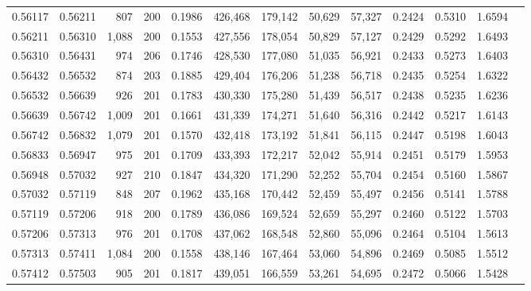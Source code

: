 \begin{tabular}{rrrrrrrrrrrrr}
0.56117 & 0.56211 &   807 & 200 &                                     0.1986 & 426,468 & 179,142 &  50,629 &  57,327 & 0.2424 & 0.5310 & 1.6594 \\
0.56211 & 0.56310 & 1,088 & 200 &                                     0.1553 & 427,556 & 178,054 &  50,829 &  57,127 & 0.2429 & 0.5292 & 1.6493 \\
0.56310 & 0.56431 &   974 & 206 &                                     0.1746 & 428,530 & 177,080 &  51,035 &  56,921 & 0.2433 & 0.5273 & 1.6403 \\
0.56432 & 0.56532 &   874 & 203 &                                     0.1885 & 429,404 & 176,206 &  51,238 &  56,718 & 0.2435 & 0.5254 & 1.6322 \\
0.56532 & 0.56639 &   926 & 201 &                                     0.1783 & 430,330 & 175,280 &  51,439 &  56,517 & 0.2438 & 0.5235 & 1.6236 \\
0.56639 & 0.56742 & 1,009 & 201 &                                     0.1661 & 431,339 & 174,271 &  51,640 &  56,316 & 0.2442 & 0.5217 & 1.6143 \\
0.56742 & 0.56832 & 1,079 & 201 &                                     0.1570 & 432,418 & 173,192 &  51,841 &  56,115 & 0.2447 & 0.5198 & 1.6043 \\
0.56833 & 0.56947 &   975 & 201 &                                     0.1709 & 433,393 & 172,217 &  52,042 &  55,914 & 0.2451 & 0.5179 & 1.5953 \\
0.56948 & 0.57032 &   927 & 210 &                                     0.1847 & 434,320 & 171,290 &  52,252 &  55,704 & 0.2454 & 0.5160 & 1.5867 \\
0.57032 & 0.57119 &   848 & 207 &                                     0.1962 & 435,168 & 170,442 &  52,459 &  55,497 & 0.2456 & 0.5141 & 1.5788 \\
0.57119 & 0.57206 &   918 & 200 &                                     0.1789 & 436,086 & 169,524 &  52,659 &  55,297 & 0.2460 & 0.5122 & 1.5703 \\
0.57206 & 0.57313 &   976 & 201 &                                     0.1708 & 437,062 & 168,548 &  52,860 &  55,096 & 0.2464 & 0.5104 & 1.5613 \\
0.57313 & 0.57411 & 1,084 & 200 &                                     0.1558 & 438,146 & 167,464 &  53,060 &  54,896 & 0.2469 & 0.5085 & 1.5512 \\
0.57412 & 0.57503 &   905 & 201 &                                     0.1817 & 439,051 & 166,559 &  53,261 &  54,695 & 0.2472 & 0.5066 & 1.5428 \\

\end{tabular}
